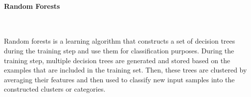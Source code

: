 \paragraph{Random Forests}~

Random forests is a learning algorithm that constructs a set of decision trees during the training step and use them for classification purposes. During the training step, multiple decision trees are generated and stored based on the examples that are included in the training set. Then, these trees are clustered by averaging their features and then used to classify new input samples into the constructed clusters or categories.




